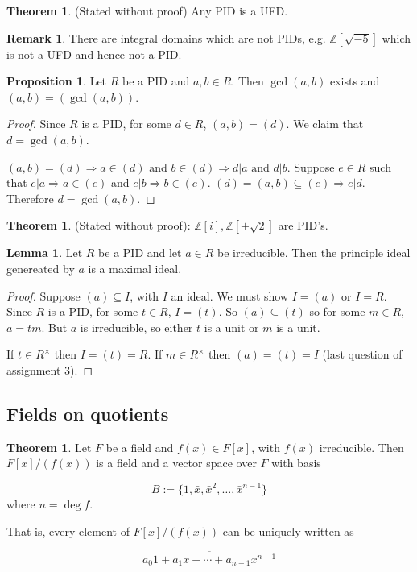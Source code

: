 \documentclass[12pt,a4paper]{article}
\theoremstyle{definition}
\newtheorem{theorem}[definition]{Theorem}
\newtheorem{proposition}[definition]{Proposition}
\newtheorem{lemma}[definition]{Lemma}
\newtheorem*{remark}{Remark}
\begin{document}
\begin{theorem}
	(Stated without proof) Any PID is a UFD.
\end{theorem}

\begin{remark}
	There are integral domains which are not PIDs, e.g. $\mathbb{Z}[\sqrt{-5}]$ which is not a UFD and hence not a PID.
\end{remark}

\begin{proposition}
	Let $R$ be a PID and $a, b \in R$. Then $\gcd(a, b)$ exists and $(a, b) = (\gcd(a, b))$.
\end{proposition}

\begin{proof}
	Since $R$ is a PID, for some $d \in R$, $(a, b) = (d)$. We claim that $d = \gcd(a, b)$.

	$(a, b) = (d) \Rightarrow a \in (d) \text{ and } b \in (d) \Rightarrow d | a \text{ and } d | b$. Suppose $e \in R$ such that $e | a \Rightarrow a \in (e)$ and $e | b \Rightarrow b \in (e)$. $(d) = (a, b) \subseteq (e) \Rightarrow e | d$. Therefore $d = \gcd(a, b)$.
\end{proof}

\begin{theorem}
	(Stated without proof): $\mathbb{Z}[i], \mathbb{Z}[\pm \sqrt{2}]$ are PID's.
\end{theorem}

\begin{lemma}
	Let $R$ be a PID and let $a \in R$ be irreducible. Then the principle ideal genereated by $a$ is a maximal ideal.
\end{lemma}

\begin{proof}
	Suppose $(a) \subseteq I$, with $I$ an ideal. We must show $I = (a)$ or $I = R$. Since $R$ is a PID, for some $t \in R$, $I = (t)$. So $(a) \subseteq (t)$ so for some $m \in R$, $a = t m$. But $a$ is irreducible, so either $t$ is a unit or $m$ is a unit.

	If $t \in R^{\times}$ then $I = (t) = R$. If $m \in R^{\times}$ then $(a) = (t) = I$ (last question of assignment 3).
\end{proof}

\subsection{Fields on quotients}

\begin{theorem}
	Let $F$ be a field and $f(x) \in F[x]$, with $f(x)$ irreducible. Then $F[x] / (f(x))$ is a field and a vector space over $F$ with basis

	\[ B := \{\bar{1}, \bar{x}, \bar{x}^2, \ldots, \bar{x}^{n - 1} \} \] where $n = \deg f$.

	That is, every element of $F[x] / (f(x))$ can be uniquely written as

	\[ \overline{a_0 1 + a_1 x + \cdots + a_{n - 1} x^{n - 1}} \]
\end{theorem}
\end{document}
